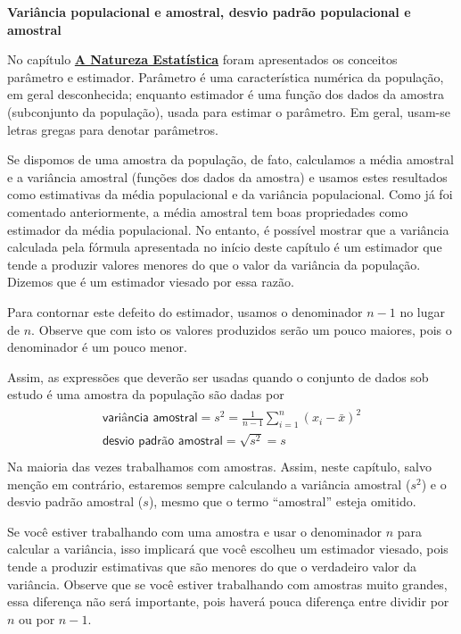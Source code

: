 {{{\textbf{Variância populacional e amostral, desvio padrão populacional e amostral}

No capítulo \textbf{\hyperref[est1-chap]{A Natureza Estatística}} foram apresentados os conceitos parâmetro e estimador. Parâmetro é uma característica numérica da população, em geral desconhecida; enquanto estimador é uma função dos dados da amostra (subconjunto da população), usada para estimar o parâmetro. Em geral, usam-se letras gregas para denotar parâmetros.

Se dispomos de uma amostra da população, de fato, calculamos a média amostral e a variância amostral (funções dos dados da amostra) e usamos estes resultados como estimativas da média populacional e da variância populacional. Como já foi comentado anteriormente, a média amostral tem boas propriedades como estimador da média populacional. No entanto, é possível mostrar que a variância calculada pela fórmula apresentada no início deste capítulo é um estimador que tende a produzir valores menores do que o valor da variância da população. Dizemos que é um estimador viesado por essa razão.

Para contornar este defeito do estimador, usamos o denominador \(n-1\) no lugar de \(n\). Observe que com isto os valores produzidos serão um pouco maiores, pois o denominador é um pouco menor.

Assim, as expressões que deverão ser usadas quando o conjunto de dados sob estudo é uma amostra da população são dadas por
\begin{align*}\!\begin{aligned}
\textsf{variância amostral}=s^2=\frac{1}{n-1}\sum^n_{i=1}(x_i-\bar{x})^2\\
\textsf{desvio padrão amostral}=\sqrt{s^2}=s\\
\end{aligned}\end{align*}
Na maioria das vezes trabalhamos com amostras. Assim, neste capítulo, salvo menção em contrário, estaremos sempre calculando a variância amostral (\(s^2\)) e o desvio padrão amostral (\(s\)), mesmo que o termo “amostral” esteja omitido.

Se você estiver trabalhando com uma amostra e usar o denominador \(n\) para calcular a variância, isso implicará que você escolheu um estimador viesado, pois tende a produzir estimativas que são menores do que o verdadeiro valor da variância. Observe que se você estiver trabalhando com amostras muito grandes, essa diferença não será importante, pois haverá pouca diferença entre dividir por \(n\) ou por \(n-1\).

}}}

